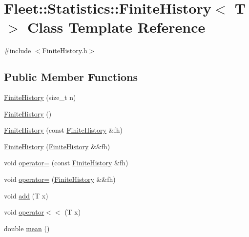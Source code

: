 \hypertarget{class_fleet_1_1_statistics_1_1_finite_history}{}\section{Fleet\+:\+:Statistics\+:\+:Finite\+History$<$ T $>$ Class Template Reference}
\label{class_fleet_1_1_statistics_1_1_finite_history}


{\ttfamily \#include $<$Finite\+History.\+h$>$}

\subsection*{Public Member Functions}
\begin{DoxyCompactItemize}
\item 
\hyperlink{class_fleet_1_1_statistics_1_1_finite_history_a14ef23d9161c620fa8dce3c42ce08220}{Finite\+History} (size\+\_\+t n)
\item 
\hyperlink{class_fleet_1_1_statistics_1_1_finite_history_ae4ca3e409992b855cef8e9430a216481}{Finite\+History} ()
\item 
\hyperlink{class_fleet_1_1_statistics_1_1_finite_history_a7c94246e763c8f3533a5aeecb3d74997}{Finite\+History} (const \hyperlink{class_fleet_1_1_statistics_1_1_finite_history}{Finite\+History} \&fh)
\item 
\hyperlink{class_fleet_1_1_statistics_1_1_finite_history_a60518d678c82115b004bbc8c319e8a63}{Finite\+History} (\hyperlink{class_fleet_1_1_statistics_1_1_finite_history}{Finite\+History} \&\&fh)
\item 
void \hyperlink{class_fleet_1_1_statistics_1_1_finite_history_a68f88a68354e3e420ca350eb6afb94cc}{operator=} (const \hyperlink{class_fleet_1_1_statistics_1_1_finite_history}{Finite\+History} \&fh)
\item 
void \hyperlink{class_fleet_1_1_statistics_1_1_finite_history_a70d3185c2d7a2a00e92cc2680d5db027}{operator=} (\hyperlink{class_fleet_1_1_statistics_1_1_finite_history}{Finite\+History} \&\&fh)
\item 
void \hyperlink{class_fleet_1_1_statistics_1_1_finite_history_a00fd21941d00d71818d6a83c2c7160e5}{add} (T x)
\item 
void \hyperlink{class_fleet_1_1_statistics_1_1_finite_history_acee6a049c14cb100dca992444b84d9ec}{operator$<$$<$} (T x)
\item 
double \hyperlink{class_fleet_1_1_statistics_1_1_finite_history_a7ece3121889428a4082fbe88fdacc106}{mean} ()
\end{DoxyCompactItemize}
